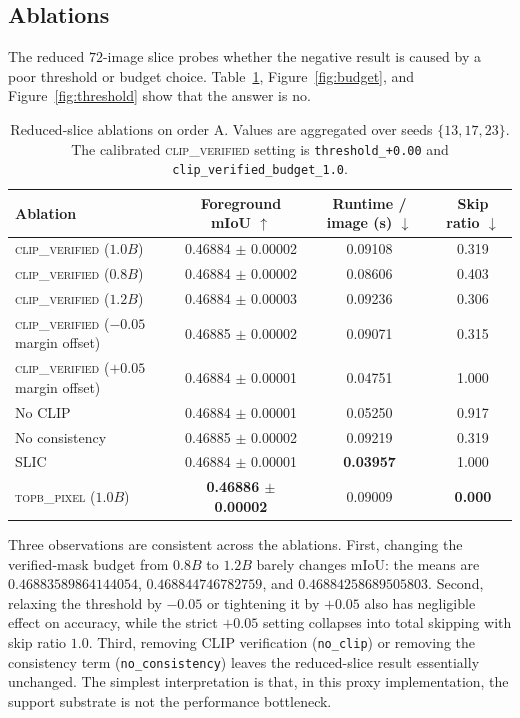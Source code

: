 \documentclass{article}
\newcommand{\method}{\textsc{clip\_verified}}
\newcommand{\topb}{\textsc{topb\_pixel}}
\newcommand{\miou}{mIoU}
\begin{document}
\subsection{Ablations}
The reduced $72$-image slice probes whether the negative result is caused by a poor threshold or budget choice. Table~\ref{tab:ablations}, Figure~\ref{fig:budget}, and Figure~\ref{fig:threshold} show that the answer is no.

\begin{table}[t]
\caption{Reduced-slice ablations on order A. Values are aggregated over seeds $\{13,17,23\}$. The calibrated \method{} setting is \texttt{threshold\_+0.00} and \texttt{clip\_verified\_budget\_1.0}.}
\label{tab:ablations}
\centering
\small
\begin{tabular}{lccc}
\toprule
Ablation & Foreground \miou{} $\uparrow$ & Runtime / image (s) $\downarrow$ & Skip ratio $\downarrow$ \\
\midrule
\method{} ($1.0B$) & 0.46884 $\pm$ 0.00002 & 0.09108 & 0.319 \\
\method{} ($0.8B$) & 0.46884 $\pm$ 0.00002 & 0.08606 & 0.403 \\
\method{} ($1.2B$) & 0.46884 $\pm$ 0.00003 & 0.09236 & 0.306 \\
\method{} ($-0.05$ margin offset) & 0.46885 $\pm$ 0.00002 & 0.09071 & 0.315 \\
\method{} ($+0.05$ margin offset) & 0.46884 $\pm$ 0.00001 & 0.04751 & 1.000 \\
No CLIP & 0.46884 $\pm$ 0.00001 & 0.05250 & 0.917 \\
No consistency & 0.46885 $\pm$ 0.00002 & 0.09219 & 0.319 \\
SLIC & 0.46884 $\pm$ 0.00001 & \textbf{0.03957} & 1.000 \\
\topb{} ($1.0B$) & \textbf{0.46886 $\pm$ 0.00002} & 0.09009 & \textbf{0.000} \\
\bottomrule
\end{tabular}
\end{table}

Three observations are consistent across the ablations. First, changing the verified-mask budget from $0.8B$ to $1.2B$ barely changes \miou{}: the means are $0.46883589864144054$, $0.468844746782759$, and $0.46884258689505803$. Second, relaxing the threshold by $-0.05$ or tightening it by $+0.05$ also has negligible effect on accuracy, while the strict $+0.05$ setting collapses into total skipping with skip ratio $1.0$. Third, removing CLIP verification (\texttt{no\_clip}) or removing the consistency term (\texttt{no\_consistency}) leaves the reduced-slice result essentially unchanged. The simplest interpretation is that, in this proxy implementation, the support substrate is not the performance bottleneck.
\end{document}
